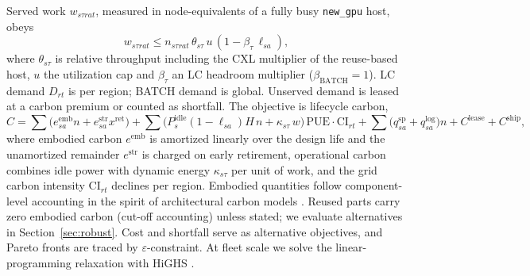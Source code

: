 Served work $w_{s\tau rat}$, measured in node-equivalents of a fully busy \texttt{new\_gpu} host, obeys
\begin{equation}
w_{s\tau rat}\le n_{s\tau rat}\,\theta_{s\tau}\,u\,(1-\beta_\tau\,\ell_{sa}),
\label{eq:cap}
\end{equation}
where $\theta_{s\tau}$ is relative throughput including the CXL multiplier of the reuse-based host, $u$ the utilization cap and $\beta_\tau$ an LC headroom multiplier ($\beta_{\text{BATCH}}=1$). LC demand $D_{rt}$ is per region; BATCH demand is global. Unserved demand is leased at a carbon premium or counted as shortfall. The objective is lifecycle carbon,
\begin{equation}
C=\sum\Big(e^{\text{emb}}_{sa}n + e^{\text{str}}_{sa}x^{\text{ret}}\Big)+\sum\Big(P^{\text{idle}}_{s}(1-\ell_{sa})H\,n+\kappa_{s\tau}\,w\Big)\,\mathrm{PUE}\cdot\mathrm{CI}_{rt}+\sum\big(q^{\text{sp}}_{sa}+q^{\text{log}}_{sa}\big)n+C^{\text{lease}}+C^{\text{ship}},
\label{eq:obj}
\end{equation}
where embodied carbon $e^{\text{emb}}$ is amortized linearly over the design life and the unamortized remainder $e^{\text{str}}$ is charged on early retirement, operational carbon combines idle power with dynamic energy $\kappa_{s\tau}$ per unit of work, and the grid carbon intensity $\mathrm{CI}_{rt}$ declines per region. Embodied quantities follow component-level accounting in the spirit of architectural carbon models \citep{gupta2022act}. Reused parts carry zero embodied carbon (cut-off accounting) unless stated; we evaluate alternatives in Section~\ref{sec:robust}. Cost and shortfall serve as alternative objectives, and Pareto fronts are traced by $\varepsilon$-constraint. At fleet scale we solve the linear-programming relaxation with HiGHS \citep{huangfu2018highs}.

